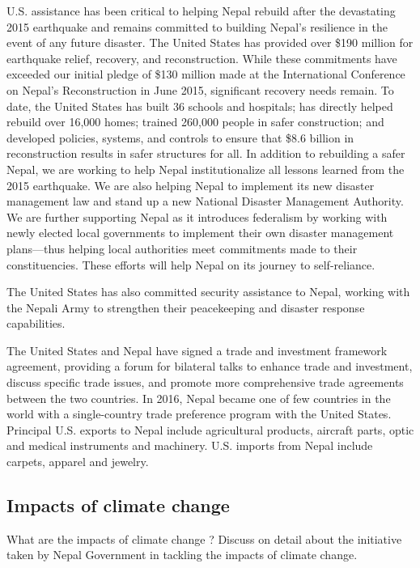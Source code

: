 \documentclass[
  openany]{book}
\begin{document}
U.S. assistance has been critical to helping Nepal rebuild after the devastating 2015 earthquake and remains committed to building Nepal's resilience in the event of any future disaster. The United States has provided over \$190 million for earthquake relief, recovery, and reconstruction. While these commitments have exceeded our initial pledge of \$130 million made at the International Conference on Nepal's Reconstruction in June 2015, significant recovery needs remain. To date, the United States has built 36 schools and hospitals; has directly helped rebuild over 16,000 homes; trained 260,000 people in safer construction; and developed policies, systems, and controls to ensure that \$8.6 billion in reconstruction results in safer structures for all. In addition to rebuilding a safer Nepal, we are working to help Nepal institutionalize all lessons learned from the 2015 earthquake. We are also helping Nepal to implement its new disaster management law and stand up a new National Disaster Management Authority. We are further supporting Nepal as it introduces federalism by working with newly elected local governments to implement their own disaster management plans---thus helping local authorities meet commitments made to their constituencies. These efforts will help Nepal on its journey to self-reliance.

The United States has also committed security assistance to Nepal, working with the Nepali Army to strengthen their peacekeeping and disaster response capabilities.

The United States and Nepal have signed a trade and investment framework agreement, providing a forum for bilateral talks to enhance trade and investment, discuss specific trade issues, and promote more comprehensive trade agreements between the two countries. In 2016, Nepal became one of few countries in the world with a single-country trade preference program with the United States. Principal U.S. exports to Nepal include agricultural products, aircraft parts, optic and medical instruments and machinery. U.S. imports from Nepal include carpets, apparel and jewelry.

\hypertarget{impacts-of-climate-change}{%
\subsection{Impacts of climate change}\label{impacts-of-climate-change}}

What are the impacts of climate change ? Discuss on detail about the initiative taken by Nepal Government in tackling the impacts of climate change.
\end{document}
